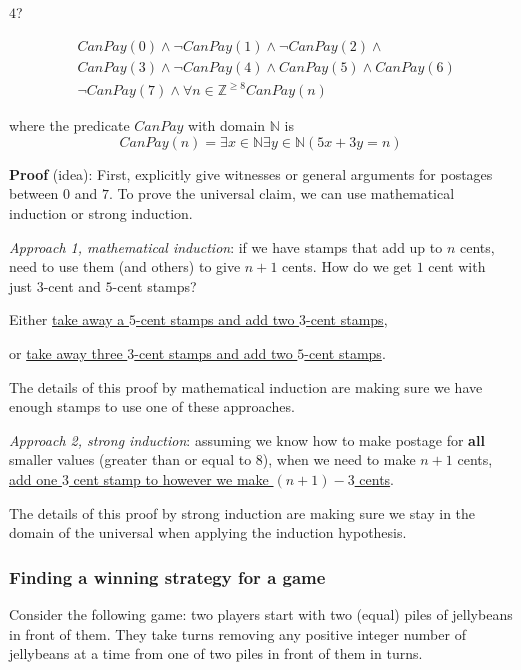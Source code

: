 \documentclass[12pt, oneside]{article}
\begin{document}
$4$?



\begin{align*}
    &CanPay(0) \land \lnot CanPay(1) \land \lnot CanPay(2) \land \\
    &CanPay(3) \land \lnot CanPay(4) \land CanPay(5) \land CanPay(6) \\
    &\lnot CanPay(7) \land \forall n \in \mathbb{Z}^{\geq 8} CanPay(n)
\end{align*}

where the predicate $CanPay$ with domain $\mathbb{N}$ is
\[
    CanPay(n) = \exists x \in \mathbb{N} \exists y \in \mathbb{N}  ( 5x+3y = n)
\]


{\bf Proof} (idea): First, explicitly give witnesses or general arguments
for postages between $0$ and $7$. 
To prove the universal claim, we can use mathematical induction or strong induction.

{\it Approach 1, mathematical induction}: if we have
stamps that add up to $n$ cents, need to use them (and others)
to give $n+1$ cents. How do we get $1$ cent with just $3$-cent
and $5$-cent stamps?

\vspace{-10pt}
Either \underline{take away a $5$-cent stamps and add two $3$-cent stamps},

\vspace{-10pt}
or \underline{take away three $3$-cent stamps and add two $5$-cent stamps}.

\vspace{-10pt}
The details of this proof by mathematical induction
are making sure we have enough 
stamps to use one of these approaches.

{\it Approach 2, strong induction}: assuming we know how to make postage
for {\bf all} smaller values (greater than or equal to $8$), when
we need to make $n+1$ cents, \underline{add one $3$ cent stamp to 
however we make $(n+1) - 3$ cents}.

\vspace{-10pt}
The details of this proof by strong induction are making sure we 
stay in the domain of the universal when applying the induction hypothesis.
 \newpage
\subsubsection*{Finding a winning strategy for a game}


Consider the following game: two players start with 
two (equal) piles of jellybeans in front of them.
They take turns removing any positive integer number
of jellybeans at a time from one of two piles in 
front of them in turns.
\end{document}
